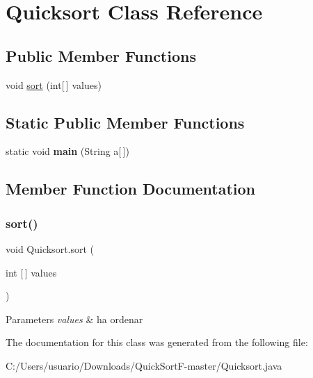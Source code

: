 \hypertarget{class_quicksort}{}\section{Quicksort Class Reference}
\label{class_quicksort}
\subsection*{Public Member Functions}
\begin{DoxyCompactItemize}
\item 
void \mbox{\hyperlink{class_quicksort_a9c72d1352eb55e6c533fd00e7b566ec6}{sort}} (int\mbox{[}$\,$\mbox{]} values)
\end{DoxyCompactItemize}
\subsection*{Static Public Member Functions}
\begin{DoxyCompactItemize}
\item 
\mbox{\label{class_quicksort_a8e7fa11afe163bcbc80b99fe97bd1631}} 
static void {\bfseries main} (String a\mbox{[}$\,$\mbox{]})
\end{DoxyCompactItemize}


\subsection{Member Function Documentation}
\mbox{\label{class_quicksort_a9c72d1352eb55e6c533fd00e7b566ec6}} 
\subsubsection{\texorpdfstring{sort()}{sort()}}
{\footnotesize\ttfamily void Quicksort.\+sort (\begin{DoxyParamCaption}\item[{int \mbox{[}$\,$\mbox{]}}]{values }\end{DoxyParamCaption})}


\begin{DoxyParams}{Parameters}
{\em values} & ha ordenar \\
\hline
\end{DoxyParams}


The documentation for this class was generated from the following file\+:\begin{DoxyCompactItemize}
\item 
C\+:/\+Users/usuario/\+Downloads/\+Quick\+Sort\+F-\/master/Quicksort.\+java\end{DoxyCompactItemize}
